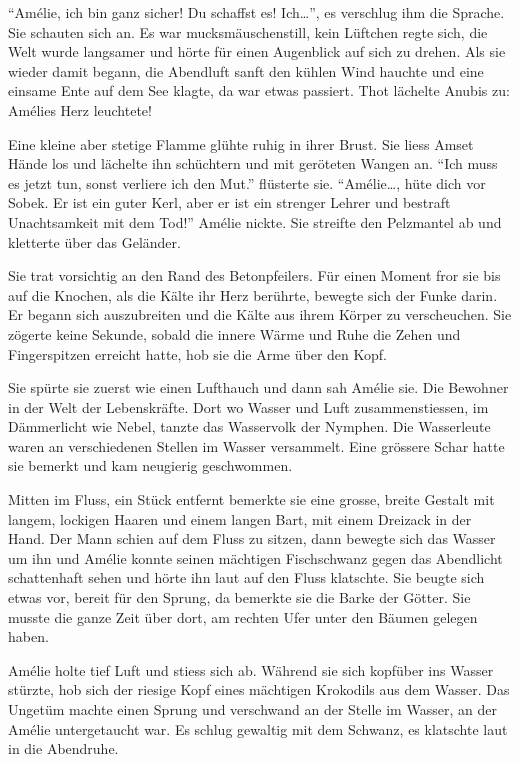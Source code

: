 \documentclass[11pt,titlepage,a5paper]{book}
\begin{document}
"`Amélie, ich bin ganz sicher! Du schaffst es! Ich\dots"', es verschlug ihm die Sprache. Sie schauten sich an. Es war mucksmäuschenstill, kein Lüftchen regte sich, die Welt wurde langsamer und hörte für einen Augenblick auf sich zu drehen. Als sie wieder damit begann, die Abendluft sanft den kühlen Wind hauchte und eine einsame Ente auf dem See klagte, da war etwas passiert. Thot lächelte Anubis zu: Amélies Herz leuchtete!

Eine kleine aber stetige Flamme glühte ruhig in ihrer Brust. Sie liess Amset Hände los und lächelte ihn schüchtern und mit geröteten Wangen an. "`Ich muss es jetzt tun, sonst verliere ich den Mut."' flüsterte sie. "`Amélie\dots, hüte dich vor Sobek. Er ist ein guter Kerl, aber er ist ein strenger Lehrer und bestraft Unachtsamkeit mit dem Tod!"' Amélie nickte. Sie streifte den Pelzmantel ab und kletterte über das Geländer. 

Sie trat vorsichtig an den Rand des Betonpfeilers. Für einen Moment fror sie bis auf die Knochen, als die Kälte ihr Herz berührte, bewegte sich der Funke darin. Er begann sich auszubreiten und die Kälte aus ihrem Körper zu verscheuchen. Sie zögerte keine Sekunde, sobald die innere Wärme und Ruhe die Zehen und Fingerspitzen erreicht hatte, hob sie die Arme über den Kopf. 

Sie spürte sie zuerst wie einen Lufthauch und dann sah Amélie sie. Die Bewohner in der Welt der Lebenskräfte. Dort wo Wasser und Luft zusammenstiessen, im Dämmerlicht wie Nebel, tanzte das Wasservolk der Nymphen. Die Wasserleute waren an verschiedenen Stellen im Wasser versammelt. Eine grössere Schar hatte sie bemerkt und kam neugierig geschwommen.

Mitten im Fluss, ein Stück entfernt bemerkte sie eine grosse, breite Gestalt mit langem, lockigen Haaren und einem langen Bart, mit einem Dreizack in der Hand. Der Mann schien auf dem Fluss zu sitzen, dann bewegte sich das Wasser um ihn und Amélie konnte seinen mächtigen Fischschwanz gegen das Abendlicht schattenhaft sehen und hörte ihn laut auf den Fluss klatschte. Sie beugte sich etwas vor, bereit für den Sprung, da bemerkte sie die Barke der Götter. Sie musste die ganze Zeit über dort, am rechten Ufer unter den Bäumen gelegen haben. 

Amélie holte tief Luft und stiess sich ab. Während sie sich kopfüber ins Wasser stürzte, hob sich der riesige Kopf eines mächtigen Krokodils aus dem Wasser. Das Ungetüm machte einen Sprung und verschwand an der Stelle im Wasser, an der Amélie untergetaucht war. Es schlug gewaltig mit dem Schwanz, es klatschte laut in die Abendruhe. 
\end{document}
